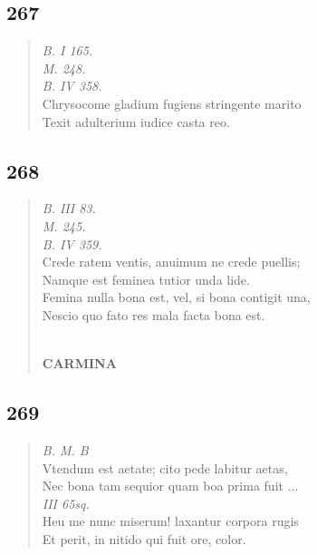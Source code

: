 \documentclass[11pt, a4paper]{report}
\begin{document}
            \subsection*{267}
      \begin{verse}
      \textit{B. I 165.} \\ \textit{M. 248.} \\ \textit{B. IV 358.} \\ Chrysocome gladium fugiens stringente marito \\ Texit adulterium iudice casta reo. \\ 
      \end{verse}
  
            \subsection*{268}
      \begin{verse}
      \textit{B. III 83.} \\ \textit{M. 245.} \\ \textit{B. IV 359.} \\ Crede ratem ventis, anuimum ne crede puellis; \\ Namque est feminea tutior unda lide. \\ Femina nulla bona est, vel, si bona contigit una, \\ Nescio quo fato res mala facta bona est. \\ 
        ﻿\pagebreak 
    \begin{center} \textbf{CARMINA} \end{center}
      \end{verse}
  
            \subsection*{269}
      \begin{verse}
      \textit{B. M. B} \\ Vtendum est aetate; cito pede labitur aetas, \\ Nec bona tam sequior quam boa prima fuit  \lbrack ... \rbrack  \\ \textit{III 65sq.} \\ Heu me nunc miserum! laxantur corpora rugis \\ Et perit, in nitido qui fuit ore, color. \\ 
      \end{verse}
  
\end{document}
